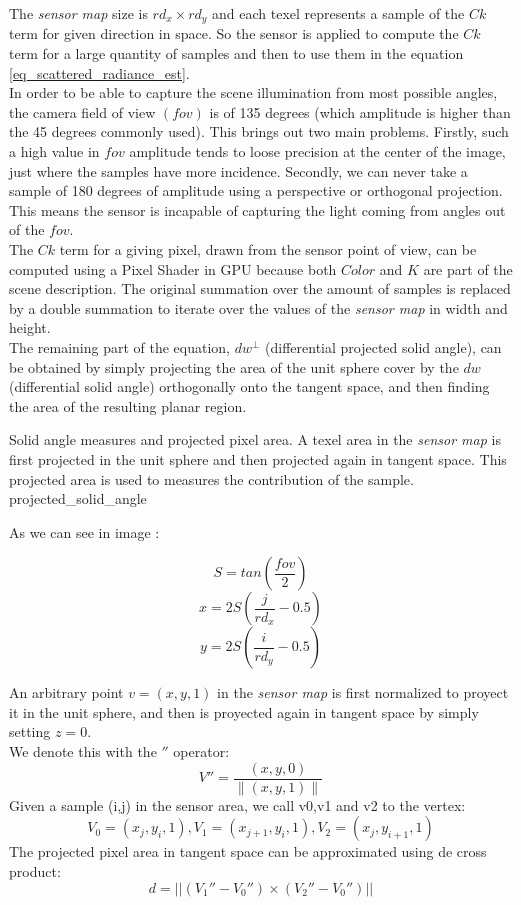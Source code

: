 \documentclass[10pt, conference]{IEEEtran}
\begin{document}
The \emph{sensor map} size is $rd_x \times rd_y$ and each texel represents a sample of the $Ck$ term for given direction in space. So the sensor is applied to compute the $Ck$ term for a large quantity of samples and then to use them in the equation \ref{eq_scattered_radiance_est}.\\
In order to be able to capture the scene illumination from most possible angles, the camera field of view $(fov)$ is of 135 degrees (which amplitude is higher than the 45 degrees commonly used). This brings out two main problems. Firstly, such a high value in $fov$ amplitude tends to loose precision at the center of the image, just where the samples have more incidence. Secondly, we can never take a sample of 180 degrees of amplitude using a perspective or orthogonal projection. This means the sensor is incapable of capturing the light coming from angles out of the $fov$.\\
The $Ck$ term for a giving pixel, drawn from the sensor point of view, can be computed using a Pixel Shader in GPU because both $Color$ and $K$ are part of the scene description. The original summation over the amount of samples is replaced by a double summation to iterate over the values of the \emph{sensor map} in width and height.\\

The remaining part of the equation, $dw^\perp$ (differential projected solid angle), can be obtained by simply projecting the area of the unit sphere 
cover by the $dw$ (differential solid angle) orthogonally onto the tangent space, and then finding the area of the resulting planar region.

\subimages
	{Solid angle measures and projected pixel area. 
	A texel area in the \emph{sensor map} is first projected in the unit sphere and then projected again in tangent space. 
	This projected area is used to measures the contribution of the sample.}
	{projected_solid_angle}{
}

As we can see in image :

\[ S = tan(\frac{fov}{2}) \]
\[ x = 2S(\frac{j}{rd_x} - 0.5) \]
\[ y = 2S(\frac{i}{rd_y} - 0.5) \]

An arbitrary point $v = (x,y,1)$ in the \emph{sensor map} is first normalized to proyect it in the unit sphere, and then is proyected again in tangent space by simply setting $z = 0$.\\ 
We denote this with the $''$ operator:\\
\[ 
	V'' = \frac{(x, y, 0)} { \left\| (x,y,1) \right\| } 
\]
Given a sample (i,j) in the sensor area, we call v0,v1 and v2 to the vertex:\\
\[ 
	V_0 = (x_j, y_i, 1), V_1 = (x_{j+1}, y_i, 1), V_2 = (x_j, y_{i+1}, 1) 
\]
The projected pixel area in tangent space can be approximated using de cross product:\\
\begin{equation}
	\label{eq_d}
	d = ||(V_1'' - V_0'') \times (V_2'' - V_0'')||
\end{equation}
\end{document}
